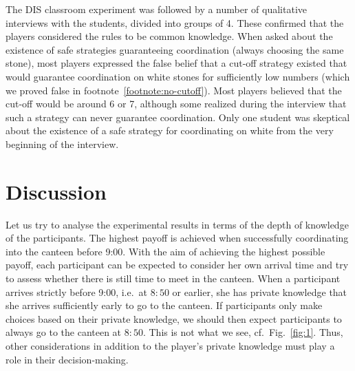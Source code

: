 \documentclass[twocolumn,a4paper,superscriptaddress,nofootinbib]{revtex4}
\begin{document}

The DIS classroom experiment was followed by a number of qualitative interviews with the students, divided into groups of 4.  These confirmed that the players considered the rules to be common knowledge. 
When asked about the existence of safe strategies guaranteeing coordination (always choosing the same stone), 
most players expressed the false belief that a cut-off strategy existed that would guarantee coordination on white stones for sufficiently low numbers (which we proved false in footnote~\ref{footnote:no-cutoff}). Most players believed that the cut-off would be around 6 or 7,  
although some realized during the interview that such a  strategy can never guarantee coordination. Only one student was skeptical about the existence of a safe strategy for coordinating on white from the very beginning of the interview. 




\section{Discussion}\label{discussion}
Let us try to analyse the experimental results in terms of the depth of knowledge of the participants. The highest payoff is achieved when successfully coordinating into the canteen before 9:00. With the aim of achieving the highest possible payoff, each participant can be expected to consider her own arrival time and try to assess whether there is still time to meet in the canteen. When a participant arrives strictly before 9:00, i.e.\ at $8{:}50$ or earlier, she has private knowledge that she arrives sufficiently early to go to the canteen. If participants only make choices based on their private knowledge, we should then expect participants to always go to the canteen at $8{:}50$. This is not what we see, cf.\ Fig.~\ref{fig:1}. Thus, other considerations in addition to the player's private knowledge must play a role in their decision-making.
\end{document}
